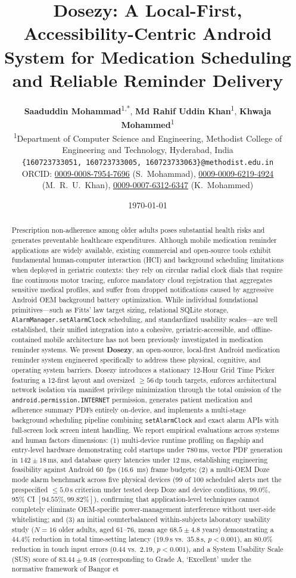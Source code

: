 \documentclass[11pt,a4paper]{article}
\title{\textbf{Dosezy: A Local-First, Accessibility-Centric Android System for Medication Scheduling and Reliable Reminder Delivery}}
\author{
  \textbf{Saaduddin Mohammad}\textsuperscript{1,*}, \textbf{Md Rahif Uddin Khan}\textsuperscript{1}, \textbf{Khwaja Mohammed}\textsuperscript{1} \\[0.5em]
  \small \textsuperscript{1}Department of Computer Science and Engineering, Methodist College of Engineering and Technology, Hyderabad, India \\[0.2em]
  \small \texttt{\{160723733051, 160723733005, 160723733063\}@methodist.edu.in} \\[0.2em]
  \small ORCID: \href{https://orcid.org/0009-0008-7954-7696}{0009-0008-7954-7696} (S.~Mohammad), \href{https://orcid.org/0009-0009-6219-4924}{0009-0009-6219-4924} (M.~R.~U.~Khan), \href{https://orcid.org/0009-0007-6312-6347}{0009-0007-6312-6347} (K.~Mohammed)
}
\date{\today}
\begin{document}
\maketitle

\begin{abstract}
Prescription non-adherence among older adults poses substantial health risks and generates preventable healthcare expenditures. Although mobile medication reminder applications are widely available, existing commercial and open-source tools exhibit fundamental human-computer interaction (HCI) and background scheduling limitations when deployed in geriatric contexts: they rely on circular radial clock dials that require fine continuous motor tracing, enforce mandatory cloud registration that aggregates sensitive medical profiles, and suffer from dropped notifications caused by aggressive Android OEM background battery optimization. While individual foundational primitives---such as Fitts' law target sizing, relational SQLite storage, \texttt{AlarmManager.setAlarmClock} scheduling, and standardized usability scales---are well established, their unified integration into a cohesive, geriatric-accessible, and offline-contained mobile architecture has not been previously investigated in medication reminder systems. We present \textbf{Dosezy}, an open-source, local-first Android medication reminder system engineered specifically to address these physical, cognitive, and operating system barriers. Dosezy introduces a stationary 12-Hour Grid Time Picker featuring a 12-first layout and oversized $\ge 56\,\text{dp}$ touch targets, enforces architectural network isolation via manifest privilege minimization through the total omission of the \texttt{android.permission.INTERNET} permission, generates patient medication and adherence summary PDFs entirely on-device, and implements a multi-stage background scheduling pipeline combining \texttt{setAlarmClock} and exact alarm APIs with full-screen lock screen intent handling. We report empirical evaluations across systems and human factors dimensions: (1) multi-device runtime profiling on flagship and entry-level hardware demonstrating cold startups under $780\,\text{ms}$, vector PDF generation in $142 \pm 18\,\text{ms}$, and database query latencies under $12\,\text{ms}$, establishing engineering feasibility against Android 60~fps (16.6~ms) frame budgets; (2) a multi-OEM Doze mode alarm benchmark across five physical devices (99 of 100 scheduled alerts met the prespecified $\le 5.0\,\text{s}$ criterion under tested deep Doze and device conditions, 99.0\%, 95\% CI $[94.55\%, 99.82\%]$), confirming that application-level techniques cannot completely eliminate OEM-specific power-management interference without user-side whitelisting; and (3) an initial counterbalanced within-subjects laboratory usability study ($N=16$ older adults, aged 61--76, mean age $68.5 \pm 4.8$ years) demonstrating a $44.4\%$ reduction in total time-setting latency ($19.9\,\text{s}$ vs.\ $35.8\,\text{s}$, $p < 0.001$), an $80.0\%$ reduction in touch input errors ($0.44$ vs.\ $2.19$, $p < 0.001$), and a System Usability Scale (SUS) score of $83.44 \pm 9.48$ (corresponding to Grade A, `Excellent' under the normative framework of Bangor et 
\end{abstract}
\end{document}
